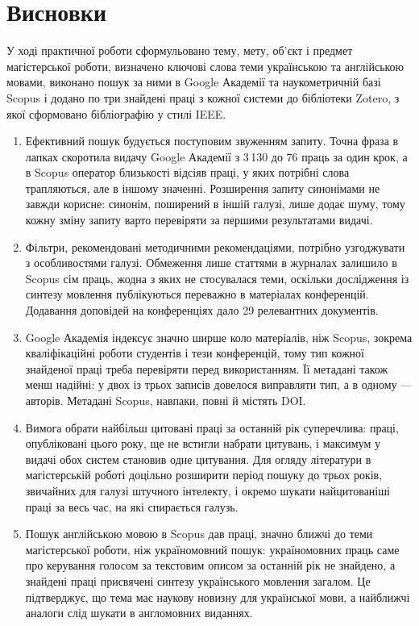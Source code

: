 \documentclass[14pt,a4paper]{extreport}
\begin{document}
\section{Висновки}

У ході практичної роботи сформульовано тему, мету, об'єкт і предмет магістерської роботи, визначено ключові слова теми українською та англійською мовами, виконано пошук за ними в Google Академії та наукометричній базі Scopus і додано по три знайдені праці з кожної системи до бібліотеки Zotero, з якої сформовано бібліографію у стилі IEEE.

\begin{enumerate}[ref=\arabic*]
\item Ефективний пошук будується поступовим звуженням запиту. Точна фраза в лапках скоротила видачу Google Академії з 3\,130 до 76 праць за один крок, а в Scopus оператор близькості відсіяв праці, у яких потрібні слова трапляються, але в іншому значенні. Розширення запиту синонімами не завжди корисне: синонім, поширений в іншій галузі, лише додає шуму, тому кожну зміну запиту варто перевіряти за першими результатами видачі.

\item Фільтри, рекомендовані методичними рекомендаціями, потрібно узгоджувати з особливостями галузі. Обмеження лише статтями в журналах залишило в Scopus сім праць, жодна з яких не стосувалася теми, оскільки дослідження із синтезу мовлення публікуються переважно в матеріалах конференцій. Додавання доповідей на конференціях дало 29 релевантних документів.

\item Google Академія індексує значно ширше коло матеріалів, ніж Scopus, зокрема кваліфікаційні роботи студентів і тези конференцій, тому тип кожної знайденої праці треба перевіряти перед використанням. Її метадані також менш надійні: у двох із трьох записів довелося виправляти тип, а в одному — авторів. Метадані Scopus, навпаки, повні й містять DOI.

\item Вимога обрати найбільш цитовані праці за останній рік суперечлива: праці, опубліковані цього року, ще не встигли набрати цитувань, і максимум у видачі обох систем становив одне цитування. Для огляду літератури в магістерській роботі доцільно розширити період пошуку до трьох років, звичайних для галузі штучного інтелекту, і окремо шукати найцитованіші праці за весь час, на які спирається галузь.

\item Пошук англійською мовою в Scopus дав праці, значно ближчі до теми магістерської роботи, ніж україномовний пошук: україномовних праць саме про керування голосом за текстовим описом за останній рік не знайдено, а знайдені праці присвячені синтезу українського мовлення загалом. Це підтверджує, що тема має наукову новизну для української мови, а найближчі аналоги слід шукати в англомовних виданнях.


\end{enumerate}
\end{document}
